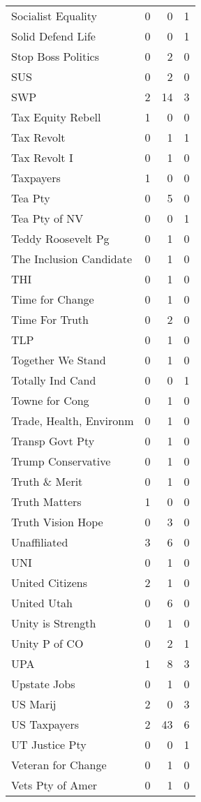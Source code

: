 \begin{supertabular}{lrrr}
Socialist Equality & 0 & 0 & 1\\
Solid Defend Life & 0 & 0 & 1\\
Stop Boss Politics & 0 & 2 & 0\\
SUS & 0 & 2 & 0\\
SWP & 2 & 14 & 3\\
Tax Equity Rebell & 1 & 0 & 0\\
Tax Revolt & 0 & 1 & 1\\
Tax Revolt I & 0 & 1 & 0\\
Taxpayers & 1 & 0 & 0\\
Tea Pty & 0 & 5 & 0\\
Tea Pty of NV & 0 & 0 & 1\\
Teddy Roosevelt Pg & 0 & 1 & 0\\
The Inclusion Candidate & 0 & 1 & 0\\
THI & 0 & 1 & 0\\
Time for Change & 0 & 1 & 0\\
Time For Truth & 0 & 2 & 0\\
TLP & 0 & 1 & 0\\
Together We Stand & 0 & 1 & 0\\
Totally Ind Cand & 0 & 0 & 1\\
Towne for Cong & 0 & 1 & 0\\
Trade, Health, Environm & 0 & 1 & 0\\
Transp Govt Pty & 0 & 1 & 0\\
Trump Conservative & 0 & 1 & 0\\
Truth \& Merit & 0 & 1 & 0\\
Truth Matters & 1 & 0 & 0\\
Truth Vision Hope & 0 & 3 & 0\\
Unaffiliated & 3 & 6 & 0\\
UNI & 0 & 1 & 0\\
United Citizens & 2 & 1 & 0\\
United Utah & 0 & 6 & 0\\
Unity is Strength & 0 & 1 & 0\\
Unity P of CO & 0 & 2 & 1\\
UPA & 1 & 8 & 3\\
Upstate Jobs & 0 & 1 & 0\\
US Marij & 2 & 0 & 3\\
US Taxpayers & 2 & 43 & 6\\
UT Justice Pty & 0 & 0 & 1\\
Veteran for Change & 0 & 1 & 0\\
Vets Pty of Amer & 0 & 1 & 0\\

\end{supertabular}
